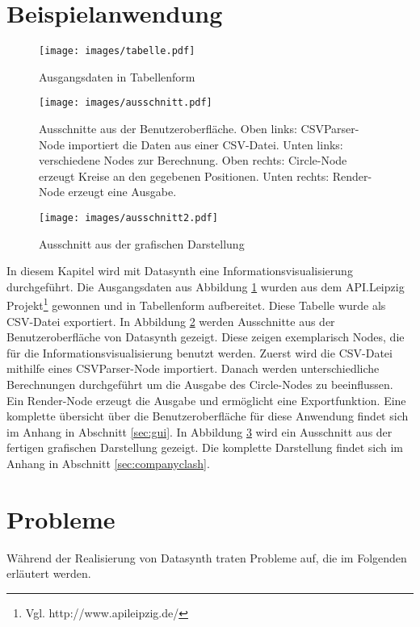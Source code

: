 \documentclass[a4paper, 
               12pt,
               DIV=calc,
               version=first,
               pdftex,
               headsepline,
               footsepline,
               bibtotocnumbered,
               liststotocnumbered]{scrreprt}
\begin{document}
\section{Beispielanwendung}
\label{sec:Beispielanwendung}
\begin{figure}
\centering
\texttt{[image: images/tabelle.pdf]}
\caption{Ausgangsdaten in Tabellenform}
\label{fig:apitabelle}
\end{figure}
\begin{figure}
\centering
\texttt{[image: images/ausschnitt.pdf]}
\caption{Ausschnitte aus der Benutzeroberfläche.
Oben links: CSVParser-Node importiert die Daten aus einer CSV-Datei.
Unten links: verschiedene Nodes zur Berechnung.
Oben rechts: Circle-Node erzeugt Kreise an den gegebenen Positionen.
Unten rechts: Render-Node erzeugt eine Ausgabe.}
\label{fig:guiausschnitt}
\end{figure}
\begin{figure}
\centering
\texttt{[image: images/ausschnitt2.pdf]}
\caption{Ausschnitt aus der grafischen Darstellung}
\label{fig:companyausschnitt}
\end{figure}
In diesem Kapitel wird mit Datasynth eine Informationsvisualisierung durchgeführt.
Die Ausgangsdaten aus Abbildung \ref{fig:apitabelle} wurden aus dem API.Leipzig Projekt\footnote{Vgl.
http://www.apileipzig.de/} gewonnen und in Tabellenform aufbereitet. Diese Tabelle wurde
als CSV-Datei exportiert.
In Abbildung \ref{fig:guiausschnitt} werden Ausschnitte aus der Benutzeroberfläche von
Datasynth gezeigt. Diese zeigen exemplarisch Nodes, die für die Informationsvisualisierung
benutzt werden. Zuerst wird die CSV-Datei mithilfe eines CSVParser-Node importiert. Danach
werden unterschiedliche Berechnungen durchgeführt um die Ausgabe des Circle-Nodes zu beeinflussen.
Ein Render-Node erzeugt die Ausgabe und ermöglicht eine Exportfunktion.
Eine komplette übersicht über die Benutzeroberfläche für diese Anwendung findet sich im Anhang
in Abschnitt \ref{sec:gui}.
In Abbildung \ref{fig:companyausschnitt} wird ein Ausschnitt aus der fertigen grafischen
Darstellung gezeigt. Die komplette Darstellung findet sich im Anhang in Abschnitt \ref{sec:companyclash}.

\section{Probleme}
\label{sec:Probleme}
Während der Realisierung von Datasynth traten Probleme auf, die im Folgenden
erläutert werden.
\end{document}
